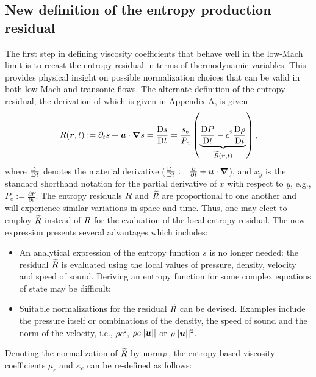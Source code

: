 \subsection{New definition of the entropy production residual}\label{sec:new_ent_prod} 

The first step in defining viscosity coefficients that behave well in the low-Mach limit is to recast the entropy residual in terms of thermodynamic variables. This provides physical insight on possible normalization choices that can be valid in both low-Mach and transonic flows. The alternate definition of the entropy residual, the derivation of which is given in Appendix A, is given %
%
\begin{equation}
\label{eq:ent_res}
R(\boldsymbol r,t) := \partial_t s + \boldsymbol u \cdot \boldsymbol{\nabla} s = \frac{\textrm{D} s}{\textrm{D} t} = \frac{s_e}{P_e} \left( \underbrace{\frac{\textrm{D} P}{\textrm{D} t} - c^2 \frac{\textrm{D} \rho}{\textrm{D} t} }_{\widetilde{R}(\boldsymbol r,t)} \right) ,
\end{equation} 
%
where $\frac{\textrm{D} \ }{\textrm{D} t}$ denotes the material derivative ($\frac{\textrm{D} \ }{\textrm{D} t}:= \frac{\partial}{\partial t} + \boldsymbol u \cdot \boldsymbol{\nabla}$), and $x_y$ is the standard shorthand notation for the partial derivative of $x$ with respect to $y$, e.g., $P_e:=\frac{\partial P}{\partial e}$. 
%
The entropy residuals $R$ and $\widetilde{R}$ are proportional to one another and will experience similar variations in space and time. Thus, one may elect to employ $\widetilde{R}$ instead of $R$ for the evaluation of the local entropy residual. The new expression presents several advantages which includes:
%
\begin{itemize}
\item An analytical expression of the entropy function $s$ is no longer needed: the residual $\widetilde{R}$ is evaluated using the local values of pressure, density, velocity and speed of sound. Deriving an entropy function for some complex equations of state may be difficult;
\item Suitable normalizations for the residual $\widetilde{R}$ can be devised. Examples include the pressure itself or combinations of the density, the speed of sound and the norm of the velocity, i.e., $\rho c^2$, $\rho c || \boldsymbol u ||$ or $\rho || \boldsymbol u ||^2$. 
\end{itemize}
%
Denoting the normalization of $\widetilde{R}$ by $\textrm{norm}_P$, the entropy-based viscosity coefficients $\mu_e$ and $\kappa_e$ can be re-defined as follows:
